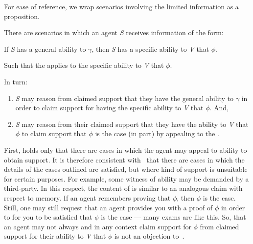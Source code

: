 \begin{note}
  For ease of reference, we wrap scenarios involving the limited information as a proposition.
  \begin{proposition}[\eA{-} --- \eA{}]\label{prem:ab}\label{prop:SE}
    There are scenarios in which an agent \emph{S} receives \gsi{} information of the form:
    \begin{center}
      If \emph{S} has a general ability to \(\gamma\), then \emph{S} has a specific ability to \emph{V} that \(\phi\).
    \end{center}

    \noindent Such that the \aben{} applies to the specific ability to \emph{V} that \(\phi\).

    In turn:
    \begin{enumerate}
    \item \emph{S} may reason from claimed support that they have the general ability to \(\gamma\) in order to claim support for having the specific ability to \emph{V} that \(\phi\). And,
    \item \emph{S} may reason from their claimed support that they have the ability to \emph{V} that \(\phi\) to claim support that \(\phi\) is the case (in part) by appealing to the \aben{}.
    \end{enumerate}
    \vspace{-\topsep}\vspace{-\topsep}
  \end{proposition}
\end{note}

\begin{note}
  First, \eA{} holds only that there are cases in which the agent may appeal to ability to obtain support.
  It is therefore consistent with~\eA{} that there are cases in which the details of the cases outlined are satisfied, but where kind of support is unsuitable for certain purposes.
  For example, some witness of ability may be demanded by a third-party.
  In this respect, the content of \eA{} is similar to an analogous claim with respect to memory.
  If an agent remembers proving that \(\phi\), then \(\phi\) is the case.
  Still, one may still request that an agent provides you with a proof of \(\phi\) in order to for you to be satisfied that \(\phi\) is the case --- many exams are like this.
  So, that an agent may not always and in any context claim support for \(\phi\) from claimed support for their ability to \emph{V} that \(\phi\) is not an objection to~\eA{}.
\end{note}

